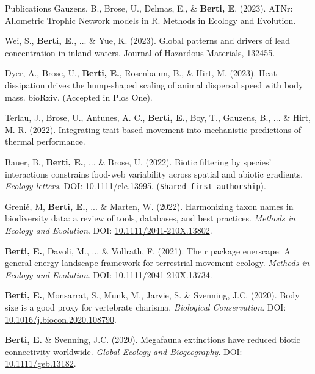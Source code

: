 \documentclass{resume} %
\begin{document}
\begin{rSection}{Publications}
Gauzens, B., Brose, U., Delmas, E., \& \textbf{Berti, E}. (2023). ATNr: Allometric Trophic Network models in R. Methods in Ecology and Evolution.

Wei, S., \textbf{Berti, E.}, ... \& Yue, K. (2023). Global patterns and drivers of lead concentration in inland waters. Journal of Hazardous Materials, 132455.

Dyer, A., Brose, U., \textbf{Berti, E.}, Rosenbaum, B., \& Hirt, M. (2023). Heat dissipation drives the hump-shaped scaling of animal dispersal speed with body mass. bioRxiv. (Accepted in Plos One).

Terlau, J., Brose, U., Antunes, A. C., \textbf{Berti, E.}, Boy, T., Gauzens, B., ... \& Hirt, M. R. (2022). Integrating trait-based movement into mechanistic predictions of thermal performance.

Bauer, B., \textbf{Berti, E.}, ... \& Brose, U. (2022). Biotic filtering by species’ interactions constrains food-web variability across spatial and abiotic gradients. \textit{Ecology letters}. DOI: \href{https://doi.org/10.1111/ele.13995}{10.1111/ele.13995}. (\texttt{Shared first authorship}).

Grenié, M, \textbf{Berti, E.}, ... \& Marten, W. (2022). Harmonizing taxon names in biodiversity data: a review of tools, databases, and best practices. \textit{Methods in Ecology and Evolution}. DOI: \href{https://doi.org/10.1111/2041-210X.13802}{10.1111/2041-210X.13802}.

\textbf{Berti, E.}, Davoli, M., ... \& Vollrath, F. (2021). The r package enerscape: A general energy landscape framework for terrestrial movement ecology. \textit{Methods in Ecology and Evolution}. DOI: \href{https://doi.org/10.1111/2041-210X.13734}{10.1111/2041-210X.13734}.

\textbf{Berti, E.}, Monsarrat, S., Munk, M., Jarvie, S. \& Svenning, J.C. (2020). Body size is a good proxy for vertebrate charisma. \textit{Biological Conservation}. DOI: \href{https://doi.org/10.1016/j.biocon.2020.108790}{10.1016/j.biocon.2020.108790}.

\textbf{Berti, E.} \& Svenning, J.C. (2020). Megafauna extinctions have reduced biotic connectivity worldwide. \textit{Global Ecology and Biogeography}. DOI: \href{https://doi.org/10.1111/geb.13182}{10.1111/geb.13182}.
\end{rSection}
\end{document}
